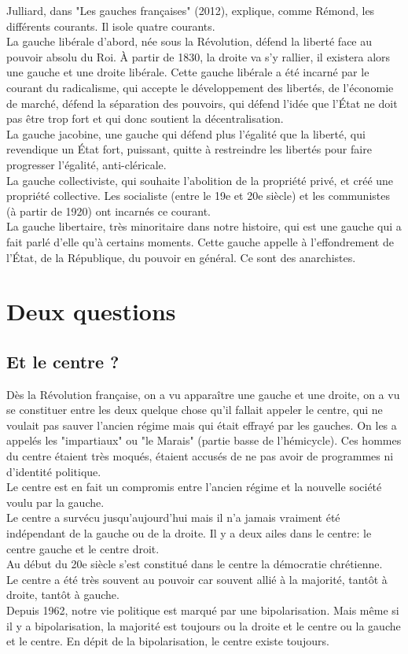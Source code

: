 \documentclass[12pt, a4paper, openany]{book}
\begin{document}
Julliard, dans "Les gauches françaises" (2012), explique, comme Rémond, les différents courants. Il isole quatre courants. \\
La gauche libérale d'abord, née sous la Révolution, défend la liberté face au pouvoir absolu du Roi. À partir de 1830, la droite va s'y rallier, il existera alors une gauche et une droite libérale. Cette gauche libérale a été incarné par le courant du radicalisme, qui accepte le développement des libertés, de l'économie de marché, défend la séparation des pouvoirs, qui défend l'idée que l'État ne doit pas être trop fort et qui donc soutient la décentralisation. \\
La gauche jacobine, une gauche qui défend plus l'égalité que la liberté, qui revendique un État fort, puissant, quitte à restreindre les libertés pour faire progresser l'égalité, anti-cléricale. \\
La gauche collectiviste, qui souhaite l'abolition de la propriété privé, et créé une propriété collective. Les socialiste (entre le 19e et 20e siècle) et les communistes (à partir de 1920) ont incarnés ce courant. \\
La gauche libertaire, très minoritaire dans notre histoire, qui est une gauche qui a fait parlé d'elle qu'à certains moments. Cette gauche appelle à l'effondrement de l'État, de la République, du pouvoir en général. Ce sont des anarchistes. 


\section{Deux questions}

\subsection{Et le centre ?}

Dès la Révolution française, on a vu apparaître une gauche et une droite, on a vu se constituer entre les deux quelque chose qu'il fallait appeler le centre, qui ne voulait pas sauver l'ancien régime mais qui était effrayé par les gauches. On les a appelés les "impartiaux" ou "le Marais" (partie basse de l'hémicycle). Ces hommes du centre étaient très moqués, étaient accusés de ne pas avoir de programmes ni d'identité politique. \\
Le centre est en fait un compromis entre l'ancien régime et la nouvelle société voulu par la gauche.\\
Le centre a survécu jusqu'aujourd'hui mais il n'a jamais vraiment été indépendant de la gauche ou de la droite. Il y a deux ailes dans le centre: le centre gauche et le centre droit. \\
Au début du 20e siècle s'est constitué dans le centre la démocratie chrétienne. \\
Le centre a été très souvent au pouvoir car souvent allié à la majorité, tantôt à droite, tantôt à gauche. \\
Depuis 1962, notre vie politique est marqué par une bipolarisation. Mais même si il y a bipolarisation, la majorité est toujours ou la droite et le centre ou la gauche et le centre. En dépit de la bipolarisation, le centre existe toujours.   
\end{document}
